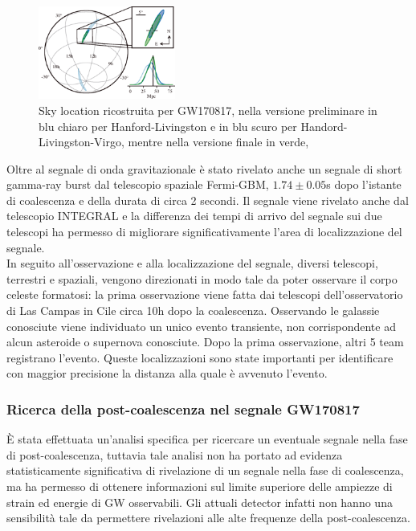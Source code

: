 \begin{figure}
	\vspace{-10pt}
	\begin{center}
		\includegraphics[width=0.4\textwidth]{figures/Capitolo_1/skymap.png}
	\end{center}
	\vspace{-5pt}
	\caption{Sky location ricostruita per GW170817, nella versione preliminare in blu chiaro per Hanford-Livingston e in blu scuro per Handord-Livingston-Virgo, mentre nella versione finale in verde, \cite{Abbott_2019}}
	\label{fig:skymap}
	\vspace{-15pt}
\end{figure}
Oltre al segnale di onda gravitazionale è stato rivelato anche un segnale di short gamma-ray burst dal telescopio spaziale Fermi-GBM, $1.74\pm0.05$s dopo l'istante di coalescenza e della durata di circa 2 secondi. Il segnale viene rivelato anche dal telescopio INTEGRAL e la differenza dei tempi di arrivo del segnale sui due telescopi ha permesso di migliorare significativamente l'area di localizzazione del segnale.\\
In seguito all'osservazione e alla localizzazione del segnale, diversi telescopi, terrestri e spaziali, vengono direzionati in modo tale da poter osservare il corpo celeste formatosi: la prima osservazione viene fatta dai telescopi dell'osservatorio di Las Campas in Cile circa 10h dopo la coalescenza. Osservando le galassie conosciute viene individuato un unico evento transiente, non corrispondente ad alcun asteroide o supernova conosciute. Dopo la prima osservazione, altri 5 team registrano l'evento. Queste localizzazioni sono state importanti per identificare con maggior precisione la distanza alla quale è avvenuto l'evento\cite{Abbott_2017c}.


\subsubsection{Ricerca della post-coalescenza nel segnale GW170817}
\label{section:postmergerGW170817}
È stata effettuata un'analisi specifica per ricercare un eventuale segnale nella fase di post-coalescenza, tuttavia tale analisi non ha portato ad evidenza statisticamente significativa di rivelazione di un segnale nella fase di coalescenza, ma ha permesso di ottenere informazioni sul limite superiore delle ampiezze di strain ed energie di GW osservabili. Gli attuali detector infatti non hanno una sensibilità tale da permettere rivelazioni alle alte frequenze della post-coalescenza.

